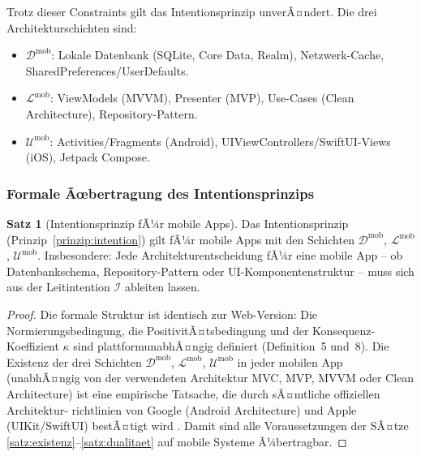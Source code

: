 ﻿\documentclass[a4paper,12pt]{article}
\theoremstyle{definition}
\newtheorem{satz}{Satz}
\begin{document}
Trotz dieser Constraints gilt das Intentionsprinzip unverÃ¤ndert. Die
drei Architekturschichten sind:

\begin{itemize}
    \item $\mathcal{D}^{\text{mob}}$: Lokale Datenbank (SQLite, Core
          Data, Realm), Netzwerk-Cache, SharedPreferences/UserDefaults.
    \item $\mathcal{L}^{\text{mob}}$: ViewModels (MVVM), Presenter (MVP),
          Use-Cases (Clean Architecture), Repository-Pattern.
    \item $\mathcal{U}^{\text{mob}}$: Activities/Fragments (Android),
          UIViewControllers/SwiftUI-Views (iOS), Jetpack Compose.
\end{itemize}

\subsubsection{Formale Ãœbertragung des Intentionsprinzips}

\begin{satz}[Intentionsprinzip fÃ¼r mobile Apps]\label{satz:mobile}
Das Intentionsprinzip (Prinzip~\ref{prinzip:intention}) gilt fÃ¼r mobile
Apps mit den Schichten $\mathcal{D}^{\text{mob}}$,
$\mathcal{L}^{\text{mob}}$, $\mathcal{U}^{\text{mob}}$.
Insbesondere: Jede Architekturentscheidung fÃ¼r eine mobile App --
ob Datenbankschema, Repository-Pattern oder UI-Komponentenstruktur --
muss sich aus der Leitintention $\mathcal{I}$ ableiten lassen.
\end{satz}

\begin{proof}
Die formale Struktur ist identisch zur Web-Version: Die Normierungsbedingung,
die PositivitÃ¤tsbedingung und der Konsequenz-Koeffizient $\kappa$ sind
plattformunabhÃ¤ngig definiert (Definition~5 und~8). Die Existenz der
drei Schichten $\mathcal{D}^{\text{mob}}$, $\mathcal{L}^{\text{mob}}$,
$\mathcal{U}^{\text{mob}}$ in jeder mobilen App (unabhÃ¤ngig von der
verwendeten Architektur MVC, MVP, MVVM oder Clean Architecture) ist
eine empirische Tatsache, die durch sÃ¤mtliche offiziellen Architektur-
richtlinien von Google (Android Architecture) und Apple (UIKit/SwiftUI)
bestÃ¤tigt wird \cite{google2023architecture, apple2023swiftui}.
Damit sind alle Voraussetzungen der SÃ¤tze \ref{satz:existenz}--\ref{satz:dualitaet}
auf mobile Systeme Ã¼bertragbar.
\end{proof}
\end{document}
